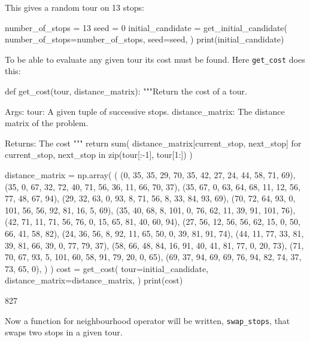 This gives a random tour on 13 stops:

\begin{pyin}
number_of_stops = 13
seed = 0
initial_candidate = get_initial_candidate(
    number_of_stops=number_of_stops,
    seed=seed,
)
print(initial_candidate)
\end{pyin}

\begin{pyout}
[0, 7, 12, 5, 11, 3, 9, 2, 8, 10, 4, 1, 6, 0]
\end{pyout}

To be able to evaluate any given tour its cost must be found. Here
\texttt{get_cost} does this:

\begin{pyin}
def get_cost(tour, distance_matrix):
    """Return the cost of a tour.

    Args:
        tour: A given tuple of successive stops.
        distance_matrix: The distance matrix of the problem.

    Returns:
        The cost
    """
    return sum(
        distance_matrix[current_stop, next_stop]
        for current_stop, next_stop in zip(tour[:-1], tour[1:])
    )
\end{pyin}

\begin{pyin}
distance_matrix = np.array(
    (
        (0, 35, 35, 29, 70, 35, 42, 27, 24, 44, 58, 71, 69),
        (35, 0, 67, 32, 72, 40, 71, 56, 36, 11, 66, 70, 37),
        (35, 67, 0, 63, 64, 68, 11, 12, 56, 77, 48, 67, 94),
        (29, 32, 63, 0, 93, 8, 71, 56, 8, 33, 84, 93, 69),
        (70, 72, 64, 93, 0, 101, 56, 56, 92, 81, 16, 5, 69),
        (35, 40, 68, 8, 101, 0, 76, 62, 11, 39, 91, 101, 76),
        (42, 71, 11, 71, 56, 76, 0, 15, 65, 81, 40, 60, 94),
        (27, 56, 12, 56, 56, 62, 15, 0, 50, 66, 41, 58, 82),
        (24, 36, 56, 8, 92, 11, 65, 50, 0, 39, 81, 91, 74),
        (44, 11, 77, 33, 81, 39, 81, 66, 39, 0, 77, 79, 37),
        (58, 66, 48, 84, 16, 91, 40, 41, 81, 77, 0, 20, 73),
        (71, 70, 67, 93, 5, 101, 60, 58, 91, 79, 20, 0, 65),
        (69, 37, 94, 69, 69, 76, 94, 82, 74, 37, 73, 65, 0),
    )
)
cost = get_cost(
    tour=initial_candidate,
    distance_matrix=distance_matrix,
)
print(cost)
\end{pyin}

\begin{pyout}
827
\end{pyout}

Now a function for neighbourhood operator will be written,
\texttt{swap_stops}, that swaps two stops in a given tour.


